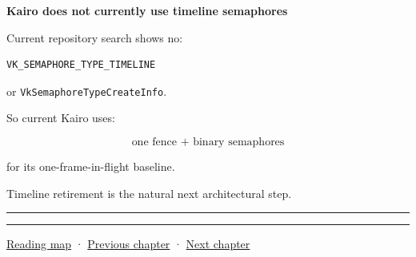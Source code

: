 \textbf{Kairo does not currently use timeline semaphores}

Current repository search shows no:

\begin{verbatim}
VK_SEMAPHORE_TYPE_TIMELINE
\end{verbatim}

or \texttt{VkSemaphoreTypeCreateInfo}.

So current Kairo uses:

\[
\boxed{
\text{one fence + binary semaphores}
}
\]

for its one-frame-in-flight baseline.

Timeline retirement is the natural next architectural step.

\begin{center}\rule{0.5\linewidth}{0.5pt}\end{center}

\begin{center}\rule{0.5\linewidth}{0.5pt}\end{center}

\hyperref[volume-reading-map]{Reading map} · \hyperref[05-engine-i-ch020-gpu-performance-models-and-principled-redesign]{Previous chapter} · \hyperref[05-engine-i-ch022-vulkan-synchronization-and-multi-frame-lifetimes]{Next chapter}
